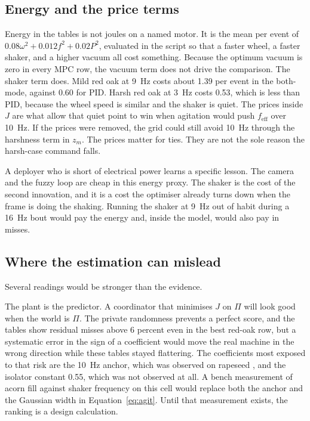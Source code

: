 \subsection{Energy and the price terms}

Energy in the tables is not joules on a named motor. It is the mean per event of $0.08\omega^2 + 0.012 f^2 + 0.02 P^2$, evaluated in the script so that a faster wheel, a faster shaker, and a higher vacuum all cost something. Because the optimum vacuum is zero in every MPC row, the vacuum term does not drive the comparison. The shaker term does. Mild red oak at 9~Hz costs about 1.39 per event in the both-mode, against 0.60 for PID. Harsh red oak at 3~Hz costs 0.53, which is less than PID, because the wheel speed is similar and the shaker is quiet. The prices inside $J$ are what allow that quiet point to win when agitation would push $f_{\mathrm{eff}}$ over 10~Hz. If the prices were removed, the grid could still avoid 10~Hz through the harshness term in $z_m$. The prices matter for ties. They are not the sole reason the harsh-case command falls.

A deployer who is short of electrical power learns a specific lesson. The camera and the fuzzy loop are cheap in this energy proxy. The shaker is the cost of the second innovation, and it is a cost the optimiser already turns down when the frame is doing the shaking. Running the shaker at 9~Hz out of habit during a 16~Hz bout would pay the energy and, inside the model, would also pay in misses.

\subsection{Where the estimation can mislead}

Several readings would be stronger than the evidence.

The plant is the predictor. A coordinator that minimises $J$ on $\Pi$ will look good when the world is $\Pi$. The private randomness prevents a perfect score, and the tables show residual misses above 6 percent even in the best red-oak row, but a systematic error in the sign of a coefficient would move the real machine in the wrong direction while these tables stayed flattering. The coefficients most exposed to that risk are the 10~Hz anchor, which was observed on rapeseed \cite{zhang2024vib,wu2022}, and the isolator constant 0.55, which was not observed at all. A bench measurement of acorn fill against shaker frequency on this cell would replace both the anchor and the Gaussian width in Equation~\eqref{eq:agit}. Until that measurement exists, the ranking is a design calculation.

